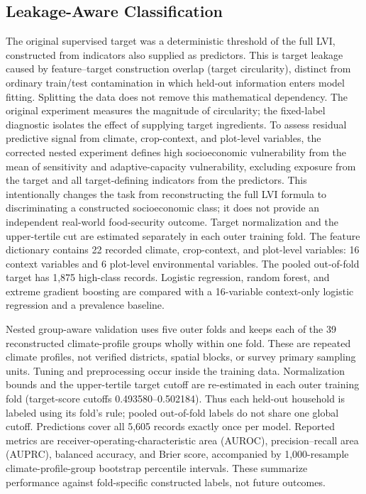\documentclass[conference,a4paper]{IEEEtran}
\begin{document}
\subsection{Leakage-Aware Classification}
The original supervised target was a deterministic threshold of the full LVI, constructed from indicators also supplied as predictors. This is target leakage caused by feature--target construction overlap (target circularity), distinct from ordinary train/test contamination in which held-out information enters model fitting. Splitting the data does not remove this mathematical dependency. The original experiment measures the magnitude of circularity; the fixed-label diagnostic isolates the effect of supplying target ingredients. To assess residual predictive signal from climate, crop-context, and plot-level variables, the corrected nested experiment defines high socioeconomic vulnerability from the mean of sensitivity and adaptive-capacity vulnerability, excluding exposure from the target and all target-defining indicators from the predictors. This intentionally changes the task from reconstructing the full LVI formula to discriminating a constructed socioeconomic class; it does not provide an independent real-world food-security outcome. Target normalization and the upper-tertile cut are estimated separately in each outer training fold. The feature dictionary contains 22 recorded climate, crop-context, and plot-level variables: 16 context variables and 6 plot-level environmental variables. The pooled out-of-fold target has 1,875 high-class records. Logistic regression, random forest, and extreme gradient boosting are compared with a 16-variable context-only logistic regression and a prevalence baseline.

Nested group-aware validation uses five outer folds and keeps each of the 39 reconstructed climate-profile groups wholly within one fold. These are repeated climate profiles, not verified districts, spatial blocks, or survey primary sampling units. Tuning and preprocessing occur inside the training data. Normalization bounds and the upper-tertile target cutoff are re-estimated in each outer training fold (target-score cutoffs 0.493580--0.502184). Thus each held-out household is labeled using its fold's rule; pooled out-of-fold labels do not share one global cutoff. Predictions cover all 5,605 records exactly once per model. Reported metrics are receiver-operating-characteristic area (AUROC), precision--recall area (AUPRC), balanced accuracy, and Brier score, accompanied by 1,000-resample climate-profile-group bootstrap percentile intervals. These summarize performance against fold-specific constructed labels, not future outcomes.
\end{document}
